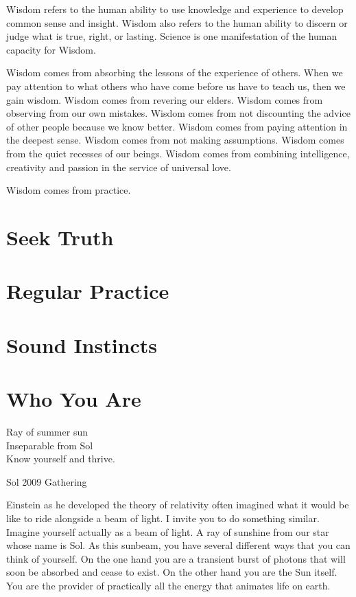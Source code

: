 \documentclass[ebook,12pt,openany,twoside]{memoir}
\newcommand{\imagefacingchapter}[1]{
  \cleartoverso
  \clearpage \null
  \thispagestyle{cleared}
  \AddToShipoutPictureBG*{%
    \AtStockLowerLeft{%
      \texttt{[image: \#1]}
    }
  }
  \clearpage
}
\begin{document}
Wisdom refers to the human ability to use knowledge and experience to develop
common sense and insight. Wisdom also refers to the human ability to discern or
judge what is true, right, or lasting. Science is one manifestation of the
human capacity for Wisdom.

Wisdom comes from absorbing the lessons of the experience of others. When we
pay attention to what others who have come before us have to teach us, then we
gain wisdom. Wisdom comes from revering our elders. Wisdom comes from
observing from our own mistakes. Wisdom comes from not discounting the
advice of other people because we know better. Wisdom comes from paying
attention in the deepest sense. Wisdom comes from not making assumptions.
Wisdom comes from the quiet recesses of our beings. Wisdom comes from
combining intelligence, creativity and passion in the service of universal love.

Wisdom comes from practice.

\chapter{Seek Truth}

\chapter{Regular Practice}

\chapter{Sound Instincts}


\imagefacingchapter{images/RayOfSummerSun-cropped}
\chapter{Who You Are}

\setlength\epigraphwidth{1.8in}
\epigraph{
  Ray of summer sun\\
  Inseparable from Sol\\
  Know yourself and thrive.
}{Sol 2009 Gathering}

\noindent Einstein as he developed the theory of relativity often imagined what it would
be like to ride alongside a beam of light. I invite you to do something
similar. Imagine yourself actually as a beam of light. A ray of sunshine from
our star whose name is Sol. As this sunbeam, you have several different ways
that you can think of yourself. On the one hand you are a transient burst of
photons that will soon be absorbed and cease to exist. On the other hand you
are the Sun itself. You are the provider of practically all the energy that
animates life on earth.
\end{document}
